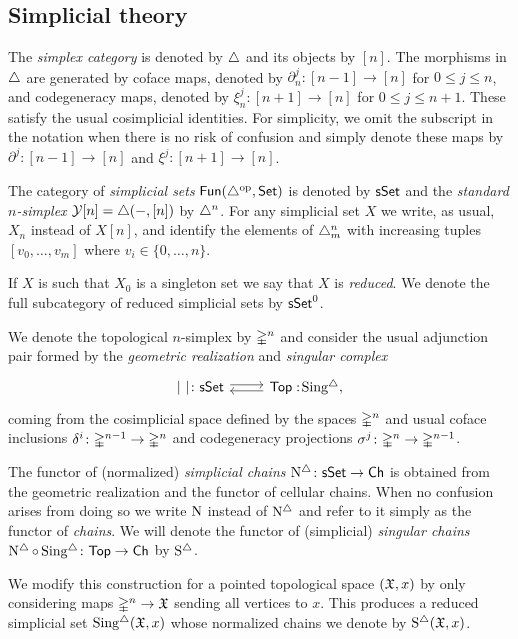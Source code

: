 \subsection{Simplicial theory}\label{ss:simplicial}

The \textit{simplex category} is denoted by $\triangle$ and its objects by $[n]$. The morphisms in $\triangle$ are generated by coface maps, denoted by $\partial^{j}_n \colon [n-1] \to [n]$ for $0\leq j \leq n$, and codegeneracy maps, denoted by $\xi^{j}_n \colon [n+1] \to [n]$ for $0 \leq j \leq n+1$. These satisfy the usual cosimplicial identities. For simplicity, we omit the subscript in the notation when there is no risk of confusion and simply denote these maps by $\partial^{j} \colon [n-1] \to [n]$ and $\xi^{j} \colon [n+1] \to [n]$.

The category of \textit{simplicial sets} $\mathsf{Fun}(\triangle^{\mathrm{op}}, \mathsf{Set})$ is denoted by $\mathsf{sSet}$ and the \textit{standard $n$-simplex} $\operatorname{\mathcal{Y}} [n] = \triangle(-, [n])$ by $\triangle^n$.
For any simplicial set $X$ we write, as usual, $X_n$ instead of $X[n]$, and identify the elements of $\triangle^n_m$ with increasing tuples $[v_0, \dots, v_m]$ where $v_i \in \{0, \dots, n\}$.

If $X$ is such that $X_0$ is a singleton set we say that $X$ is \textit{reduced}.
We denote the full subcategory of reduced simplicial sets by $\mathsf{sSet}^0$.

We denote the topological $n$-simplex by $\mathbb{\Delta}^{n}$ and consider the usual adjunction pair formed by the \textit{geometric realization} and \textit{singular complex}
\[
\begin{tikzcd}
	\bars{\ } \colon \sSet \arrow[r, shift left=.5ex] &
	\Top :\! \sSing, \arrow[l, shift left=.5ex]
\end{tikzcd}
\]
coming from the cosimplicial space defined by the spaces $\mathbb{\Delta}^n$ and usual coface inclusions $\delta^i \colon \mathbb{\Delta}^{n-1} \to \mathbb{\Delta}^n$ and codegeneracy projections $\sigma^j \colon \mathbb{\Delta}^n \to \mathbb{\Delta}^{n-1}$.

The functor of (normalized) \textit{simplicial chains} $\operatorname{N^{\triangle}} \colon \mathsf{sSet} \to \mathsf{Ch}$ is obtained from the geometric realization and the functor of cellular chains.
When no confusion arises from doing so we write $\operatorname{N}$ instead of $\operatorname{N^{\triangle}}$ and refer to it simply as the functor of \textit{chains}.
We will denote the functor of (simplicial) \textit{singular chains} $\operatorname{N^{\triangle}} \circ \operatorname{Sing^{\triangle}} \colon \mathsf{Top} \to \mathsf{Ch}$ by $\operatorname{S^{\triangle}}$.

We modify this construction for a pointed topological space $(\mathfrak{X},x)$ by only considering maps $\mathbb{\Delta}^n \to \mathfrak{X}$ sending all vertices to $x$.
This produces a reduced simplicial set $\operatorname{Sing^{\triangle}}(\mathfrak{X},x)$ whose normalized chains we denote by $\operatorname{S^{\triangle}}(\mathfrak{X},x)$.

